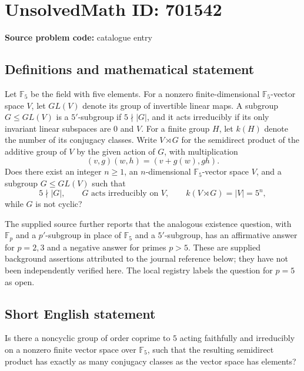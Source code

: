 \documentclass[11pt]{article}
\newcommand{\F}{\mathbb{F}}
\begin{document}
\section*{UnsolvedMath ID: 701542}
\textbf{Source problem code:} catalogue entry
\subsection{Definitions and mathematical statement}
Let \(\F_5\) be the field with five elements. For a nonzero finite-dimensional \(\F_5\)-vector space \(V\), let \(GL(V)\) denote its group of invertible linear maps. A subgroup \(G\leq GL(V)\) is a \(5'\)-subgroup if \(5\nmid |G|\), and it acts irreducibly if its only invariant linear subspaces are \(0\) and \(V\). For a finite group \(H\), let \(k(H)\) denote the number of its conjugacy classes. Write \(V\rtimes G\) for the semidirect product of the additive group of \(V\) by the given action of \(G\), with multiplication
\[
(v,g)(w,h)=(v+g(w),gh).
\]
Does there exist an integer \(n\geq 1\), an \(n\)-dimensional \(\F_5\)-vector space \(V\), and a subgroup \(G\leq GL(V)\) such that
\[
5\nmid |G|,\qquad G\text{ acts irreducibly on }V,\qquad k(V\rtimes G)=|V|=5^n,
\]
while \(G\) is not cyclic?

The supplied source further reports that the analogous existence question, with \(\F_p\) and a \(p'\)-subgroup in place of \(\F_5\) and a \(5'\)-subgroup, has an affirmative answer for \(p=2,3\) and a negative answer for primes \(p>5\). These are supplied background assertions attributed to the journal reference below; they have not been independently verified here. The local registry labels the question for \(p=5\) as open.
\subsection{Short English statement}
Is there a noncyclic group of order coprime to \(5\) acting faithfully and irreducibly on a nonzero finite vector space over \(\F_5\), such that the resulting semidirect product has exactly as many conjugacy classes as the vector space has elements?
\end{document}
